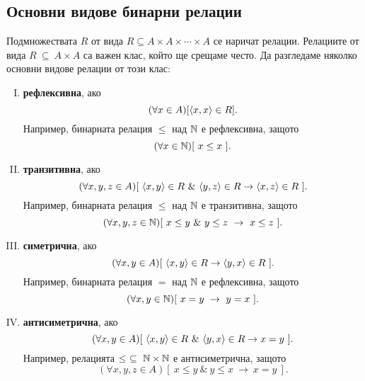 \subsection*{Основни видове бинарни релации}

Подмножествата $R$ от вида $R \subseteq A\times A\times\cdots\times A$ се наричат релации.
Релациите от вида $R\ \subseteq\ A\times A$ са важен клас, който ще срещаме често.
Да разгледаме няколко основни видове релации от този клас:
\begin{enumerate}[I)]
\item
  {\bf рефлексивна}, ако
  \[(\forall x\in A)[\langle{x,x}\rangle\in R].\]
  Например, бинарната релация $\leq$ над $\mathbb{N}$ е рефлексивна, защото
  \[(\forall x\in \Nat)[\ x \leq x\ ].\]
\item
  {\bf транзитивна}, ако
  \[(\forall x,y,z\in A)[\ \pair{x,y}\in R\ \&\ \pair{y,z}\in R \rightarrow \pair{x,z}\in R\ ].\]
  Например, бинарната релация $\leq$ над $\mathbb{N}$ е транзитивна, защото
  \[(\forall x,y,z\in \mathbb{N})[\ x \leq y\ \&\ y \leq z\ \rightarrow\ x\leq z\ ].\]
\item
  {\bf симетрична}, ако
  \[(\forall x,y\in A)[\ \langle{x,y}\rangle\in R \rightarrow \langle{y,x}\rangle\in R\ ].\]
  Например, бинарната релация $=$ над $\mathbb{N}$ е рефлексивна, защото
  \[(\forall x,y\in \mathbb{N})[\ x = y\ \rightarrow\ y = x\ ].\]
\item
  {\bf антисиметрична}, ако
  \[(\forall x,y\in A)[\ \pair{x,y}\in R\ \&\ \pair{y,x}\in R \rightarrow x = y\ ].\]
  Например, релацията $\leq\ \subseteq\ \mathbb{N}\times\mathbb{N}$ е антисиметрична, защото
  \[(\forall x,y,z\in A)[\ x \leq y\ \&\ y \leq x\ \rightarrow\ x = y\ ].\]
\end{enumerate}


